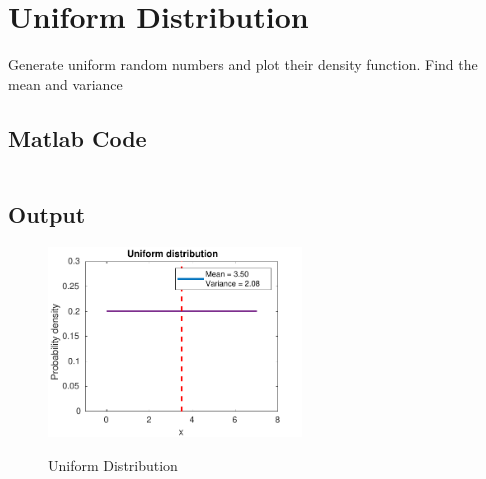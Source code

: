\section{Uniform Distribution}
\label{sec:Uniform density function}

Generate uniform random numbers and plot
their density function. Find the mean and variance

\subsection{Matlab Code}

\inputminted[fontsize=\footnotesize,autogobble]{matlab}{code/uniform.m}

\pagebreak
\subsection{Output}

\begin{figure}[!htb]
    \centering
    \includegraphics[width=0.6\textwidth]{res/figures/Figure_5.pdf}
    \label{output:uniform distribution}
    \caption{Uniform Distribution}
\end{figure}